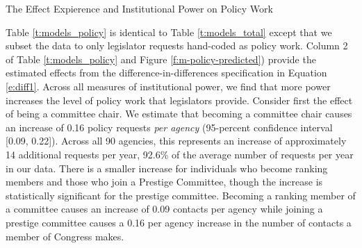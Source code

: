 \documentclass[12pt]{article}
\begin{document}
{\begin{table}[hbt!]
\caption{The Effect Expierence and Institutional Power on Policy Work} \label{t:models_policy}
\begin{minipage}{\textwidth}
\begin{center}
\end{center}
\end{minipage}
\end{table}


Table \ref{t:models_policy} is identical to Table \ref{t:models_total} except that we subset the data to only legislator requests hand-coded as policy work. 
Column 2 of Table \ref{t:models_policy} and Figure \ref{f:m-policy-predicted}) provide the estimated effects from the difference-in-differences specification in Equation \ref{e:diff1}. Across all measures of institutional power, we find that more power increases the level of policy work that legislators provide. Consider first the effect of being a committee chair. We estimate that becoming a committee chair causes an increase of 0.16 policy requests \textit{per agency} (95-percent confidence interval [0.09, 0.22]). Across all 90 agencies, this represents an increase of approximately 14 additional requests per year, 92.6\% of the average number of requests per year in our data. There is a smaller increase for individuals who become ranking members and those who join a Prestige Committee, though the increase is statistically significant for the prestige committee. Becoming a ranking member of a committee causes an increase of 0.09 contacts per agency while joining a prestige committee causes a 0.16 per agency increase in the number of contacts a member of Congress makes.

}
\end{document}
